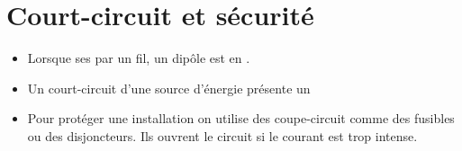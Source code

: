 \documentclass[xcolor={dvipsnames}]{beamer}
\begin{document}
\section{Court-circuit et sécurité}

\begin{frame}
\begin{mybilan}
	\begin{itemize}
		\item Lorsque ses  par un fil, un dipôle est en .
		\item Un court-circuit d'une source d'énergie présente un 
		
		\item Pour protéger une installation on utilise des coupe-circuit comme des fusibles ou des disjoncteurs. Ils ouvrent le circuit si le courant est trop intense.
	\end{itemize}
\end{mybilan}
\end{frame}
%
%
%	
%
%
%
%	
%	
%
%
%
%	
%			
%			


%
%	
%
%
%	
\end{document}

